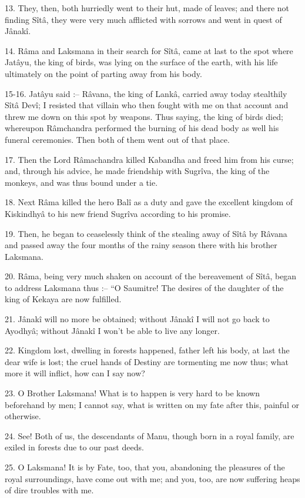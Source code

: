 13. They, then, both hurriedly went to their hut, made of leaves; and there not finding S\^it\^a, they were very much afflicted with sorrows and went in quest of J\^anak\^i.

14. R\^ama and Laksmana in their search for S\^it\^a, came at last to the spot where Jat\^ayu, the king of birds, was lying on the surface of the earth, with his life ultimately on the point of parting away from his body.

15-16. Jat\^ayu said :-- R\^avana, the king of Lank\^a, carried away today stealthily S\^it\^a Dev\^i; I resisted that villain who then fought with me on that account and threw me down on this spot by weapons. Thus saying, the king of birds died; whereupon R\^amchandra performed the burning of his dead body as well his funeral ceremonies. Then both of them went out of that place.

17. Then the Lord R\^amachandra killed Kabandha and freed him from his curse; and, through his advice, he made friendship with Sugr\^iva, the king of the monkeys, and was thus bound under a tie.

18. Next R\^ama killed the hero Bal\^i as a duty and gave the excellent kingdom of Kiskindhy\^a to his new friend Sugr\^iva according to his promise.

19. Then, he began to ceaselessly think of the stealing away of S\^it\^a by R\^avana and passed away the four months of the rainy season there with his brother Laksmana.

20. R\^ama, being very much shaken on account of the bereavement of S\^it\^a, began to address Laksmana thus :-- ``O Saumitre! The desires of the daughter of the king of Kekaya are now fulfilled.

21. J\^anak\^i will no more be obtained; without J\^anak\^i I will not go back to Ayodhy\^a; without J\^anak\^i I won't be able to live any longer.

22. Kingdom lost, dwelling in forests happened, father left his body, at last the dear wife is lost; the cruel hands of Destiny are tormenting me now thus; what more it will inflict, how can I say now?

23. O Brother Laksmana! What is to happen is very hard to be known beforehand by men; I cannot say, what is written on my fate after this, painful or otherwise.

24. See! Both of us, the descendants of Manu, though born in a royal family, are exiled in forests due to our past deeds.

25. O Laksmana! It is by Fate, too, that you, abandoning the pleasures of the royal surroundings, have come out with me; and you, too, are now suffering heaps of dire troubles with me.


